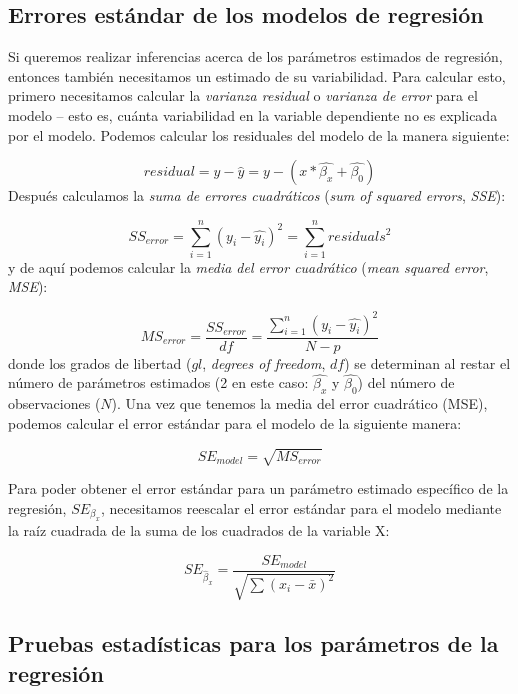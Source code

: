 \documentclass[
  12pt,
]{book}
\theoremstyle{definition}
\theoremstyle{definition}
\theoremstyle{definition}
\theoremstyle{remark}
\begin{document}
\hypertarget{errores-estuxe1ndar-de-los-modelos-de-regresiuxf3n}{%
\subsection{Errores estándar de los modelos de regresión}\label{errores-estuxe1ndar-de-los-modelos-de-regresiuxf3n}}

Si queremos realizar inferencias acerca de los parámetros estimados de regresión, entonces también necesitamos un estimado de su variabilidad. Para calcular esto, primero necesitamos calcular la \emph{varianza residual} o \emph{varianza de error} para el modelo -- esto es, cuánta variabilidad en la variable dependiente no es explicada por el modelo. Podemos calcular los residuales del modelo de la manera siguiente:

\[
residual = y - \hat{y} = y - (x*\hat{\beta_x} + \hat{\beta_0})
\]
Después calculamos la \emph{suma de errores cuadráticos} (\emph{sum of squared errors}, \emph{SSE}):

\[
SS_{error} = \sum_{i=1}^n{(y_i - \hat{y_i})^2} = \sum_{i=1}^n{residuals^2}
\]
y de aquí podemos calcular la \emph{media del error cuadrático} (\emph{mean squared error}, \emph{MSE}):

\[
MS_{error} = \frac{SS_{error}}{df} = \frac{\sum_{i=1}^n{(y_i - \hat{y_i})^2} }{N - p}
\]
donde los grados de libertad (\(gl\), \emph{degrees of freedom}, \(df\)) se determinan al restar el número de parámetros estimados (2 en este caso: \(\hat{\beta_x}\) y \(\hat{\beta_0}\)) del número de observaciones (\(N\)). Una vez que tenemos la media del error cuadrático (MSE), podemos calcular el error estándar para el modelo de la siguiente manera:

\[
SE_{model} = \sqrt{MS_{error}}
\]

Para poder obtener el error estándar para un parámetro estimado específico de la regresión, \(SE_{\beta_x}\), necesitamos reescalar el error estándar para el modelo mediante la raíz cuadrada de la suma de los cuadrados de la variable X:

\[
SE_{\hat{\beta}_x} = \frac{SE_{model}}{\sqrt{{\sum{(x_i - \bar{x})^2}}}}
\]

\hypertarget{pruebas-estaduxedsticas-para-los-paruxe1metros-de-la-regresiuxf3n}{%
\subsection{Pruebas estadísticas para los parámetros de la regresión}\label{pruebas-estaduxedsticas-para-los-paruxe1metros-de-la-regresiuxf3n}}
\end{document}
